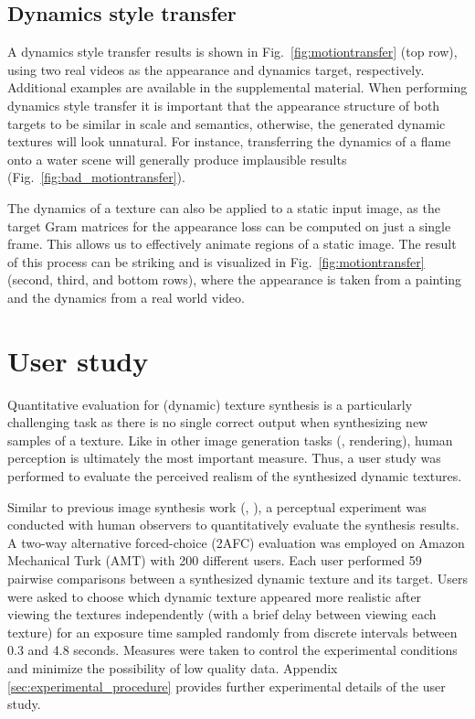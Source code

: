 

\subsection{Dynamics style transfer}

A dynamics style transfer results is shown in Fig.\ 
\ref{fig:motiontransfer} (top row), using two real videos as the appearance and dynamics target, respectively.
Additional examples are available in the supplemental material.
When performing dynamics style transfer it is important
that the appearance structure of both targets to be similar in scale and semantics,
otherwise, the generated dynamic textures will look unnatural.
For instance, transferring the dynamics of a flame onto a water 
scene will generally produce implausible results (Fig.\ \ref{fig:bad_motiontransfer}).



The dynamics of a texture can also be applied to a static input image,
as the target Gram matrices for the appearance loss can be computed
on just a single frame.
This allows us to effectively animate regions of a static image.
The result of this process can be striking and is visualized in
Fig.\ \ref{fig:motiontransfer} (second, third, and bottom rows), where the appearance is 
taken from a painting and the dynamics from a real world video.

\clearpage

\clearpage

\section{User study}\label{sec:user_study}

Quantitative evaluation for (dynamic) texture synthesis is a particularly
challenging task as there is no single correct output when 
synthesizing new samples of a texture.
Like in other image generation tasks (\eg, rendering), 
human perception is ultimately the most important measure.
Thus, a user study was performed to evaluate the perceived 
realism of the synthesized dynamic textures.

Similar to previous image synthesis work (\eg, \cite{chen2017}), 
a perceptual experiment was conducted with human observers to 
quantitatively evaluate the synthesis results.
A two-way alternative forced-choice (2AFC) evaluation was employed on Amazon Mechanical
Turk (AMT) with 200 different users. Each user performed 59
pairwise comparisons between a synthesized dynamic texture and 
its target.
Users were asked to choose which dynamic texture appeared more realistic
after viewing the textures independently (with a brief delay between viewing each texture) for an exposure time sampled
randomly from discrete intervals between 0.3 and 4.8 seconds.
Measures were taken to control the experimental conditions and
minimize the possibility of low quality data.
Appendix \ref{sec:experimental_procedure} provides further experimental
details of the user study.

